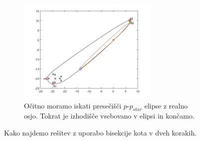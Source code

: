 \documentclass[12pt,a4paper]{amsart}
\theoremstyle{definition}
\theoremstyle{plain}
\begin{document}
\begin{figure}[h]
\hfill
\begin{subfigure}[t]{0.45\textwidth}
\includegraphics[width=0.9\linewidth,height=5cm]{druga-konec.jpg}
\caption{Očitno moramo iskati presečišči $p$-$p_{star}$ elipse z realno osjo. Tokrat je izhodišče vsebovano v elipsi in končamo.}
\label{fig:p83}
\end{subfigure}
\caption{Kako najdemo rešitev z uporabo bisekcije kota v dveh korakih.}
\label{fig:p8}
\end{figure}

\clearpage


\end{document}
